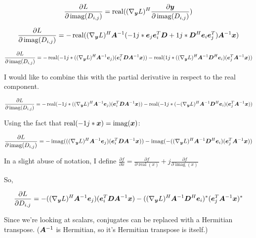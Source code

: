 \documentclass{article}
\begin{document}
\begin{equation}
\frac{\partial L}{\partial \operatorname{imag}(D_{i,j})} = \operatorname{real}((\nabla_{\bm{y}} L)^H\frac{\partial \bm{y}}{\partial \operatorname{imag}(D_{i,j})})
\end{equation}

\begin{equation}
\frac{\partial L}{\partial \operatorname{imag}(D_{i,j})} = -\operatorname{real}((\nabla_{\bm{y}} L)^H\bm{A}^{-1}(-1j*\bm{e}_j\bm{e}_i^T\bm{D} + 1j*\bm{D}^H\bm{e}_i\bm{e}_j^T)\bm{A}^{-1}\bm{x})
\end{equation}

\begin{equation}
\frac{\partial L}{\partial \operatorname{imag}(D_{i,j})} = -\operatorname{real}(-1j*((\nabla_{\bm{y}} L)^H\bm{A}^{-1}\bm{e}_j)(\bm{e}_i^T\bm{D}\bm{A}^{-1}\bm{x})) - \operatorname{real}(1j*((\nabla_{\bm{y}} L)^H\bm{A}^{-1}\bm{D}^H\bm{e}_i)(\bm{e}_j^T\bm{A}^{-1}\bm{x}))
\end{equation}

I would like to combine this with the partial derivative in respect to the real component.

\begin{equation}
\frac{\partial L}{\partial \operatorname{imag}(D_{i,j})} = -\operatorname{real}(-1j*((\nabla_{\bm{y}} L)^H\bm{A}^{-1}\bm{e}_j)(\bm{e}_i^T\bm{D}\bm{A}^{-1}\bm{x})) - \operatorname{real}(-1j*(-(\nabla_{\bm{y}} L)^H\bm{A}^{-1}\bm{D}^H\bm{e}_i)(\bm{e}_j^T\bm{A}^{-1}\bm{x}))
\end{equation}

Using the fact that $\operatorname{real}(-1j*\bm{x}) = \operatorname{imag}(\bm{x})$:

\begin{equation}
\frac{\partial L}{\partial \operatorname{imag}(D_{i,j})} = -\operatorname{imag}(((\nabla_{\bm{y}} L)^H\bm{A}^{-1}\bm{e}_j)(\bm{e}_i^T\bm{D}\bm{A}^{-1}\bm{x})) - \operatorname{imag}(-((\nabla_{\bm{y}} L)^H\bm{A}^{-1}\bm{D}^H\bm{e}_i)(\bm{e}_j^T\bm{A}^{-1}\bm{x}))
\end{equation}

In a slight abuse of notation, I define $\frac{\partial f}{\partial x} = \frac{\partial f}{\partial \operatorname{real}(x)} + j\frac{\partial f}{\partial \operatorname{imag}(x)}$

So,

\begin{equation}
\frac{\partial L}{\partial D_{i,j}} = -((\nabla_{\bm{y}} L)^H\bm{A}^{-1}\bm{e}_j)(\bm{e}_i^T\bm{D}\bm{A}^{-1}\bm{x}) - ((\nabla_{\bm{y}} L)^H\bm{A}^{-1}\bm{D}^H\bm{e}_i)^*(\bm{e}_j^T\bm{A}^{-1}\bm{x})^*
\end{equation}

Since we're looking at scalars, conjugates can be replaced with a Hermitian transpose. ($\bm{A}^{-1}$ is Hermitian, so it's Hermitian transpose is itself.)
\end{document}
